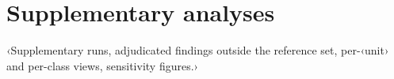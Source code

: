 \clearpage
\section{Supplementary analyses}
\label{app:supp}
‹Supplementary runs, adjudicated findings outside the reference set, per-‹unit› and per-class views, sensitivity figures.›

